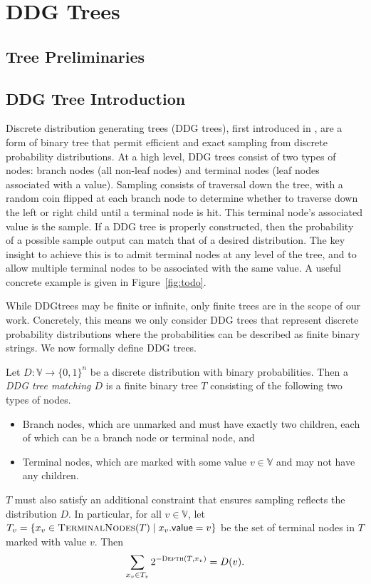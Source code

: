 \section{DDG Trees} \label{sec:ddg-trees}

\subsection{Tree Preliminaries}

\subsection{DDG Tree Introduction}

Discrete distribution generating trees (DDG trees), first introduced in \cite{ALGCPLX:KnuYao76}, are a form of binary tree that permit efficient and exact sampling from discrete probability distributions.
At a high level, DDG trees consist of two types of nodes: branch nodes (all non-leaf nodes) and terminal nodes (leaf nodes associated with a value). 
Sampling consists of traversal down the tree, with a random coin flipped at each branch node to determine whether to traverse down the left or right child until a terminal node is hit.
This terminal node's associated value is the sample.
If a DDG tree is properly constructed, then the probability of a possible sample output can match that of a desired distribution. 
The key insight to achieve this is to admit terminal nodes at any level of the tree, and to allow multiple terminal nodes to be associated with the same value.
A useful concrete example is given in Figure~\ref{fig:todo}.

While DDGtrees may be finite or infinite, only finite trees are in the scope of our work.
Concretely, this means we only consider DDG trees that represent discrete probability distributions where the probabilities can be described as finite binary strings. 
We now formally define DDG trees.

\begin{definition} \label{def:ddg-tree}
Let $D:\mathbb{V} \to \{0, 1\}^n$ be a discrete distribution with binary probabilities. Then a \emph{DDG tree matching $D$} is a finite binary tree $T$ consisting of the following two types of nodes.
\begin{itemize}
	\item Branch nodes, which are unmarked and must have exactly two children, each of which can be a branch node or terminal node, and
	\item Terminal nodes, which are marked with some value $v \in \mathbb{V}$ and may not have any children.
\end{itemize}
$T$ must also satisfy an additional constraint that ensures sampling reflects the distribution $D$. In particular, for all $v \in \mathbb{V}$, let $T_v = \{ x_v \in \textsc{TerminalNodes}(T) \mid x_v.\mathsf{value} = v\}$ be the set of terminal nodes in $T$ marked with value $v$. Then
$$ \sum_{x_v \in T_v} 2^{-\textsc{Depth}(T, x_v)} = D(v).$$
\end{definition}

